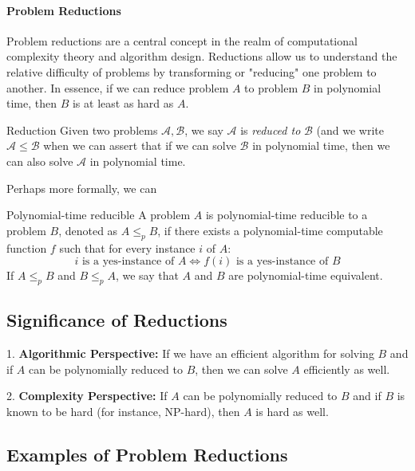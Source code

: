 \paragraph{Problem Reductions}

Problem reductions are a central concept in the realm of computational complexity theory and algorithm design. Reductions allow us to understand the relative difficulty of problems by transforming or "reducing" one problem to another. In essence, if we can reduce problem \(A\) to problem \(B\) in polynomial time, then \(B\) is at least as hard as \(A\).

\begin{definition}{Reduction}{}
Given two problems $\mathcal A, \mathcal B$, we say $\mathcal A$ is \emph{reduced to} $\mathcal B$ (and we write $\mathcal A \leq \mathcal B$ when we can assert that if we can solve $\mathcal B$ in polynomial time, then we can also solve $\mathcal A$ in polynomial time.
\end{definition}

Perhaps more formally, we can 

\begin{definition}{Polynomial-time reducible}{}
A problem \(A\) is polynomial-time reducible to a problem \(B\), denoted as \(A \leq_p B\), if there exists a polynomial-time computable function \(f\) such that for every instance \(i\) of \(A\):
\[ i \text{ is a yes-instance of } A \iff f(i) \text{ is a yes-instance of } B \]
If \(A \leq_p B\) and \(B \leq_p A\), we say that \(A\) and \(B\) are polynomial-time equivalent.
\end{definition}

\subsection{Significance of Reductions}

1. \textbf{Algorithmic Perspective:} If we have an efficient algorithm for solving \(B\) and if \(A\) can be polynomially reduced to \(B\), then we can solve \(A\) efficiently as well.

2. \textbf{Complexity Perspective:} If \(A\) can be polynomially reduced to \(B\) and if \(B\) is known to be hard (for instance, NP-hard), then \(A\) is hard as well.

\subsection{Examples of Problem Reductions}

